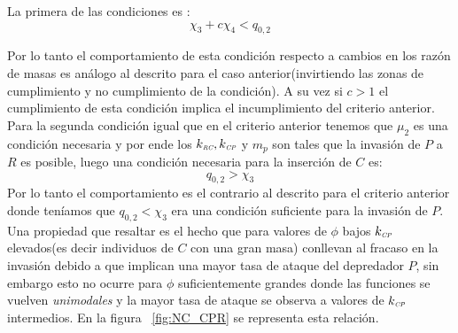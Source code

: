 La primera de las condiciones es :
\begin{equation}
  \chi_3 + c \chi_4 < q_{0,2}
\end{equation}

Por lo tanto el comportamiento de esta condici\'on respecto a cambios en los raz\'on de masas es an\'alogo al descrito para el caso anterior(invirtiendo las zonas de cumplimiento y no cumplimiento de la condici\'on). A su vez si $c>1$ el cumplimiento de esta condici\'on implica el incumplimiento del criterio anterior.\\
Para la segunda condici\'on igual que en el criterio anterior tenemos que $\mu_2$ es una condici\'on necesaria y por ende los $k_{\textit{\tiny RC}}, k_{\textit{\tiny CP}}$ y $m_p$ son tales que la invasi\'on de $P$ a $R$ es posible, luego una condici\'on necesaria para la inserci\'on de $C$ es:
\begin{equation}
  q_{0,2} > \chi_3
\end{equation}
Por lo tanto el comportamiento es el contrario al descrito para el criterio anterior donde ten\'iamos que $q_{0,2} < \chi_3$ era una condici\'on suficiente para la invasi\'on de $P$. Una propiedad que resaltar es el hecho que para valores de $\phi$ bajos $k_{\textit{\tiny CP}}$ elevados(es decir individuos de $C$ con una gran masa) conllevan al fracaso en la invasi\'on debido a que implican una mayor tasa de ataque del depredador $P$, sin embargo esto no ocurre para $\phi$ suficientemente grandes donde las funciones se vuelven \emph{unimodales} y la mayor tasa de ataque se observa a valores de $k_{\textit{\tiny CP}}$ intermedios. En la figura ~\ref{fig:NC_CPR} se representa esta relaci\'on. \\


